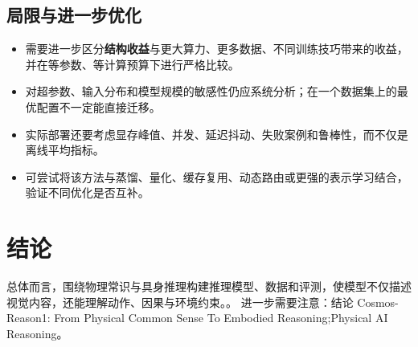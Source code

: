\documentclass[UTF8,11pt,a4paper]{ctexart}
\newcommand{\term}[1]{\textbf{\textcolor{mainblue}{#1}}}
\begin{document}
\subsection{局限与进一步优化}
\begin{itemize}
\item 需要进一步区分\term{结构收益}与更大算力、更多数据、不同训练技巧带来的收益，并在等参数、等计算预算下进行严格比较。
\item 对超参数、输入分布和模型规模的敏感性仍应系统分析；在一个数据集上的最优配置不一定能直接迁移。
\item 实际部署还要考虑显存峰值、并发、延迟抖动、失败案例和鲁棒性，而不仅是离线平均指标。
\item 可尝试将该方法与蒸馏、量化、缓存复用、动态路由或更强的表示学习结合，验证不同优化是否互补。
\end{itemize}

\section{结论}
总体而言，围绕物理常识与具身推理构建推理模型、数据和评测，使模型不仅描述视觉内容，还能理解动作、因果与环境约束。。 进一步需要注意：结论 Cosmos-Reason1: From Physical Common Sense To Embodied Reasoning;Physical AI Reasoning。
\end{document}

